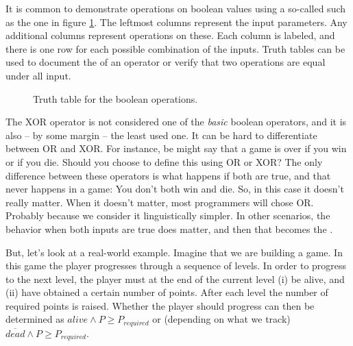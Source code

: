 It is common to demonstrate operations on boolean values using a so-called  such as the one in figure \ref{fig:prim:bool:ops}. The leftmost columns represent the input parameters. Any additional columns represent operations on these. Each column is labeled, and there is one row for each possible combination of the inputs. Truth tables can be used to document the  of an operator or verify that two operations are equal under all input.

\begin{figure}[tbp]
  
  \caption{Truth table for the boolean operations.}
  \label{fig:prim:bool:ops}
\end{figure}

The XOR operator is not considered one of the \textsl{basic} boolean operators, and it is also -- by some margin -- the least used one. It can be hard to differentiate between OR and XOR. For instance, be might say that a game is over if you win or if you die. Should you choose to define this using OR or XOR? The only difference between these operators is what happens if both are true, and that never happens in a game: You don't both win and die. So, in this case it doesn't really matter. When it doesn't matter, most programmers will chose OR. Probably because we consider it linguistically simpler. In other scenarios, the behavior when both inputs are true does matter, and then that becomes the .

But, let's look at a real-world example. Imagine that we are building a game. In this game the player progresses through a sequence of levels. In order to progress to the next level, the player must at the end of the current level (i) be alive, and (ii) have obtained a certain number of points. After each level the number of required points is raised. Whether the player should progress can then be determined as $alive \wedge P \geq P_{required}$ or (depending on what we track) $\overline{dead} \wedge P \geq P_{required}$.


